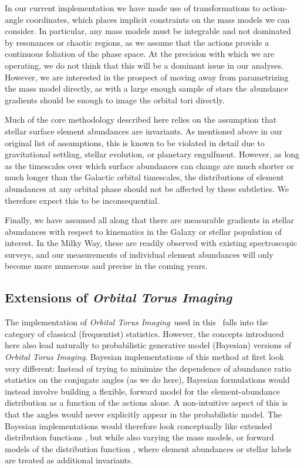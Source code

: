 \documentclass[modern]{aastex63}
\newcommand{\methodname}{\textsl{Orbital Torus Imaging}}
\begin{document}
In our current implementation we have made use of transformations to
action-angle coordinates, which places implicit constraints on the mass models
we can consider.
In particular, any mass models must be integrable and not dominated by
resonances or chaotic regions, as we assume that the actions provide a
continuous foliation of the phase space.
At the precision with which we are operating, we do not think that this will be
a dominant issue in our analyses.
However, we are interested in the prospect of moving away from parametrizing the
mass model directly, as with a large enough sample of stars the abundance
gradients should be enough to image the orbital tori directly.

Much of the core methodology described here relies on the assumption that
stellar surface element abundances are invariants.
As mentioned above in our original list of assumptions, this is known to be
violated in detail due to gravitational settling, stellar evolution, or
planetary engulfment.
However, as long as the timescales over which surface abundances can change are
much shorter or much longer than the Galactic orbital timescales, the
distributions of element abundances at any orbital phase should not be affected
by these subtleties.
We therefore expect this to be inconsequential.

Finally, we have assumed all along that there are measurable gradients in
stellar abundances with respect to kinematics in the Galaxy or stellar
population of interest.
In the Milky Way, these are readily observed with existing spectroscopic
surveys, and our measurements of individual element abundances will only become
more numerous and precise in the coming years.


\subsection{Extensions of \methodname}

The implementation of \methodname\ used in this \documentname\ falls into the
category of classical (frequentist) statistics.
However, the concepts introduced here also lead naturally to probabilistic
generative model (Bayesian) versions of \methodname.
Bayesian implementations of this method at first look very different:
Instead of trying to minimize the dependence of abundance ratio statistics on
the conjugate angles (as we do here), Bayesian formulations would instead
involve building a flexible, forward model for the element-abundance
distribution as a function of the actions alone.
A non-intuitive aspect of this is that the angles would never explicitly appear
in the probabilistic model.
The Bayesian implementations would therefore look conceptually like extended
distribution functions \citep{Sanders:2015}, but while also varying the mass
models, or forward models of the distribution function
\citep[e.g.,][]{Magorrian:2014}, where element abundances or stellar labels are
treated as additional invariants.
\end{document}
